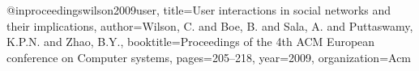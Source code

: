 

@inproceedings{wilson2009user,
  title={User interactions in social networks and their implications},
  author={Wilson, C. and Boe, B. and Sala, A. and Puttaswamy, K.P.N. and Zhao, B.Y.},
  booktitle={Proceedings of the 4th ACM European conference on Computer systems},
  pages={205--218},
  year={2009},
  organization={Acm}
}


